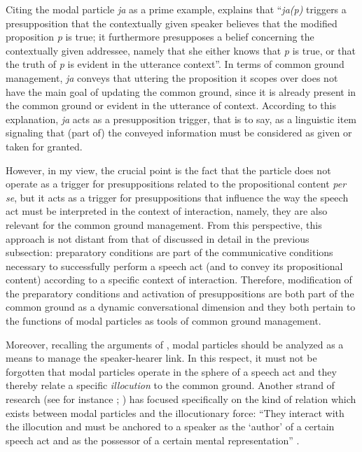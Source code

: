 Citing the modal particle \textit{ja} as a prime example, \citet[337]{Grosz2016} explains that “\textit{ja(p)} triggers a presupposition that the contextually given speaker believes that the modified proposition \textit{p} is true; it furthermore presupposes a belief concerning the contextually given addressee, namely that she either knows that \textit{p} is true, or that the truth of \textit{p} is evident in the utterance context”. In terms of common ground management, \textit{ja} conveys that uttering the proposition it scopes over does not have the main goal of updating the common ground, since it is already present in the common ground or evident in the utterance of context. According to this explanation, \textit{ja} acts as a presupposition trigger, that is to say, as a linguistic item signaling that (part of) the conveyed information must be considered as given or taken for granted.

However, in my view, the crucial point is the fact that the particle does not operate as a trigger for presuppositions related to the propositional content \textit{per se}, but it acts as a trigger for presuppositions that influence the way the speech act must be interpreted in the context of interaction, namely, they are also relevant for the common ground management. From this perspective, this approach is not distant from that of \citet{Waltereit2001} discussed in detail in the previous subsection: preparatory conditions are part of the communicative conditions necessary to successfully perform a speech act (and to convey its propositional content) according to a specific context of interaction. Therefore, modification of the preparatory conditions and activation of presuppositions are both part of the common ground as a dynamic conversational dimension and they both pertain to the functions of modal particles as tools of common ground management.

Moreover, recalling the arguments of \citet{DetgesGévaudan2018}, modal particles should be analyzed as a means to manage the speaker-hearer link. In this respect, it must not be forgotten that modal particles operate in the sphere of a speech act and they thereby relate a specific \textit{illocution} to the common ground. Another strand of research (see for instance \citealt{Jacobs1991}; \citealt{Coniglio2012}) has focused specifically on the kind of relation which exists between modal particles and the illocutionary force: “They interact with the illocution and must be anchored to a speaker as the ‘author’ of a certain speech act and as the possessor of a certain mental representation” \citep[255]{Coniglio2012}.

